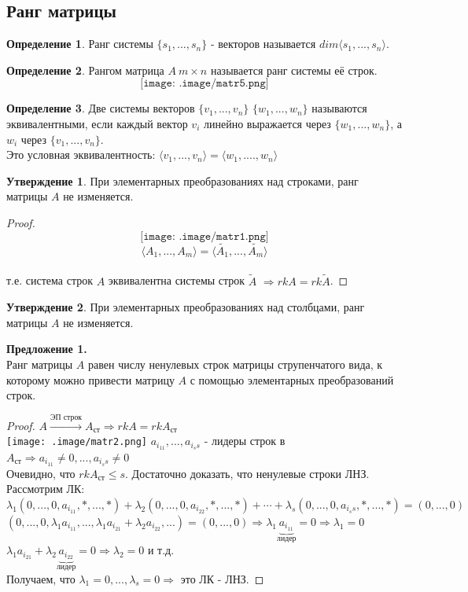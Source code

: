 \documentclass[a4paper, 12pt]{article}
\theoremstyle{definition}
\newtheorem*{definition}{Определение}
\newtheorem*{subtheorem}{Утверждение}
\begin{document}
  \subsection{Ранг матрицы}
  \begin{definition}
    Ранг системы $\{s_1,...,s_n\}$ - векторов называется $dim \langle s_1,...,s_n \rangle$.
  \end{definition} 
  \begin{definition}
    Рангом матрица $A \ m\times n$ называется ранг системы её строк. $$\texttt{[image: .image/matr5.png]}$$
  \end{definition} 
  \begin{definition}
    Две системы векторов $\{v_1,...,v_n\}$ $\{w_1,...,w_n\}$ называются эквивалентными, если каждый вектор $v_i$ линейно выражается через $\{w_1,...,w_n\}$, а $w_i$ через $\{v_1,...,v_n\}$. \\
    Это условная эквивалентность: $\langle v_1,...,v_n \rangle = \langle w_1,....,w_n \rangle$ 
  \end{definition} 
  \begin{subtheorem}
    При элементарных преобразованиях над строками, ранг матрицы $A$  не изменяется.
  \end{subtheorem} 
  \begin{proof} 
    $$\texttt{[image: .image/matr1.png]}$$
    $$\langle A_1,...,A_m \rangle = \langle \widetilde{A_1},...,\widetilde{A_m} \rangle$$ \\
    т.е. система строк $A$ эквивалентна системы строк $\widetilde{A}$ $\Longrightarrow rkA = rk \widetilde{A}$. 
  \end{proof} 
  \begin{subtheorem}
    При элементарных преобразованиях над столбцами, ранг матрицы $A$  не изменяется.
  \end{subtheorem} 
  \textbf{Предложение 1.} \\
   Ранг матрицы $A$ равен числу ненулевых строк матрицы струпенчатого вида, к которому можно привести матрицу $A$ с помощью элементарных преобразований строк.
  \begin{proof}
    $A \overset{\text{ЭП строк}}{\longrightarrow } A_{\text{ст}} \Longrightarrow  rkA = rkA_{\text{ст}}$ \\
    \texttt{[image: .image/matr2.png]}
    $a_{i_11},...,a_{i_ss}$ - лидеры строк в $A_{\text{ст}} \Longrightarrow a_{i_11} \neq 0,...,a_{i_ss} \neq 0$ \\
    Очевидно, что $rkA_{\text{ст}}\leq s$. Достаточно доказать, что ненулевые строки ЛНЗ. Рассмотрим ЛК: \\
    $\lambda_1(0,...,0,a_{i_11},\ast,...,\ast) + \lambda_2(0,...,0,a_{i_22},\ast,...,\ast) + \cdots + \lambda_s(0,...,0,a_{i_ss},\ast,...,\ast) = (0,...,0)$ \\
    $(0,...,0,\lambda_1 a_{i_11},...,\lambda_1a_{i_21} + \lambda_2a_{i_22},...) = (0,...,0) \Longrightarrow \lambda_1 \underbrace {a_{i_11}}_{\text{лидер}}= 0 \Longrightarrow \lambda_1 = 0$ \\
    $\lambda_1a_{i_21} + \lambda_2\underbrace {a_{i_22}}_{\text{лидер}} = 0 \Longrightarrow \lambda_2 = 0$ и т.д. \\
    Получаем, что $\lambda_1 = 0,...,\lambda_s = 0 \Longrightarrow$ это ЛК - ЛНЗ. 
  \end{proof} 
\end{document}
